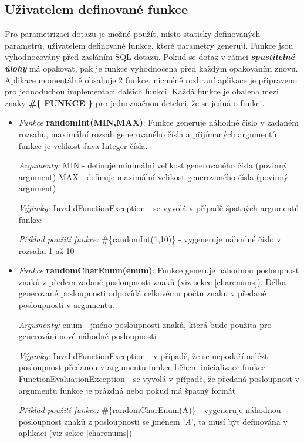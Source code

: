 \documentclass[czech,bachelor,public,dept460,male,cpdeclaration,twoside]{diploma}
\begin{document}
\subsection{Uživatelem definované funkce} \label{functions}
Pro parametrizaci dotazu je možné použít, místo staticky definovaných parametrů, uživatelem definované funkce, které parametry generují. Funkce jsou vyhodnocovány před zasláním SQL dotazu. Pokud se dotaz v rámci \textbf{\emph{spustitelné úlohy}} má opakovat, pak je funkce vyhodnocena před každým opakováním znovu. Aplikace momentálně obsahuje 2 funkce, nicméně rozhraní aplikace je připraveno pro jednoduchou implementaci dalších funkcí. Každá funkce je obalena mezi znaky \textbf{\#\{ FUNKCE \}} pro jednoznačnou detekci, že se jedná o funkci.
\begin{itemize}
\item
\textit{Funkce} \textbf{randomInt(MIN,MAX)}:\newline
Funkce generuje náhodné číslo v zadaném rozsahu, maximální rozsah generovaného čísla a přijímaných argumentů funkce je velikost Java Integer čísla.


\textit{Argumenty:}\newline
MIN - definuje minimální velikost generovaného čísla (povinný argument)\newline
MAX - definuje maximální velikost generovaného čísla (povinný argument)\newline

\textit{Výjimky:}\newline
InvalidFunctionException - se vyvolá v případě špatných argumentů funkce\newline

\textit{Příklad použití funkce:}\newline
\#\{randomInt(1,10)\} - vygeneruje náhodné číslo v rozsahu 1 až 10


\item
\textit{Funkce} \textbf{randomCharEnum(enum)}:\newline
Funkce generuje náhodnou posloupnost znaků z předem zadané posloupnosti znaků (viz sekce \ref{charenums}). Délka generované posloupnosti odpovídá celkovému počtu znaku v předané posloupnosti v argumentu.


\textit{Argumenty:}\newline
enum - jméno posloupnosti znaků, která bude použita pro generování nové náhodné posloupnosti\newline

\textit{Výjimky:}\newline
InvalidFunctionException - v případě, že se nepodaří nalézt posloupnost předanou v argumentu funkce během inicializace funkce\newline
FunctionEvaluationException - se vyvolá v případě, že předaná posloupnost v argumentu funkce je prázdná nebo pokud má špatný formát\newline

\textit{Příklad použití funkce:}\newline
\#\{randomCharEnum(A)\} - vygeneruje náhodnou posloupnost znaků z posloupnosti se jménem '\textit{A}', ta musí být definována v aplikaci (viz sekce \ref{charenums})

\end{itemize}
\end{document}

